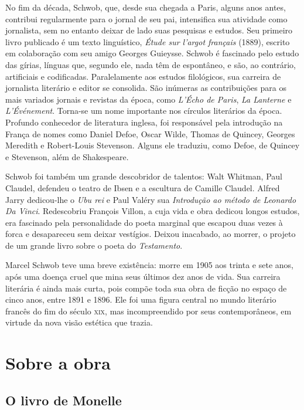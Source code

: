 No fim da década, Schwob, que, desde sua chegada a Paris, alguns anos antes,
contribui regularmente para o jornal de seu pai, intensifica sua atividade como
jornalista, sem no entanto deixar de lado suas pesquisas e estudos. Seu
primeiro livro publicado é um texto linguístico, \textit{Étude sur l’argot
français} (1889), escrito em colaboração com seu amigo Georges Guieysse. Schwob
é fascinado pelo estudo das gírias, línguas que, segundo ele, nada têm de
espontâneo, e são, ao contrário, artificiais e codificadas. Paralelamente aos
estudos filológicos, sua carreira de jornalista literário e editor se
consolida. São inúmeras as contribuições para os mais variados jornais e
revistas da época, como \textit{L’Écho de Paris}, \textit{La Lanterne} e
\textit{L’Événement}. Torna-se um nome importante nos círculos literários da
época. Profundo conhecedor de literatura inglesa, foi responsável pela
introdução na França de nomes como Daniel Defoe, Oscar Wilde, Thomas de
Quincey, Georges Meredith e Robert-Louis Stevenson. Alguns ele traduziu, como
Defoe, de Quincey e Stevenson, além de Shakespeare.

Schwob foi também um grande descobridor de talentos: Walt Whitman, Paul
Claudel, defendeu o teatro de Ibsen e a escultura de Camille Claudel. Alfred
Jarry dedicou-lhe o \textit{Ubu rei} e Paul Valéry sua \textit{Introdução ao
método de Leonardo Da Vinci}. Redescobriu François Villon, a cuja vida e obra
dedicou longos estudos, era fascinado pela personalidade do poeta marginal que
escapou duas vezes à forca e desapareceu sem deixar vestígios. Deixou
inacabado, ao morrer, o projeto de um grande livro sobre o poeta do
\textit{Testamento}.

Marcel Schwob teve uma breve existência: morre em 1905 aos trinta e sete
anos, após uma doença cruel que mina seus últimos dez anos de vida. Sua
carreira literária é ainda mais curta, pois compõe toda sua obra de ficção no
espaço de cinco anos, entre 1891 e 1896. Ele foi uma figura central no mundo
literário francês do fim do século \textsc{xix}, mas incompreendido por seus
contemporâneos, em virtude da nova visão estética que trazia.

\section{Sobre a obra}

\subsection{O livro de Monelle}

